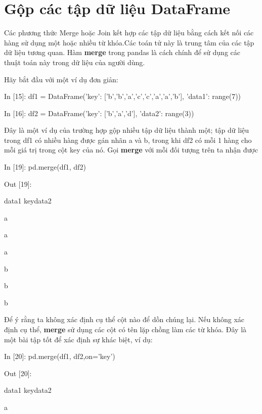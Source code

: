 \section{Gộp các tập dữ liệu DataFrame}
Các phương thức Merge hoặc Join kết hợp các tập dữ liệu bằng cách kết nối các hàng sử dụng một hoặc nhiều từ khóa.Các toán tử này là trung tâm của các tập dữ liệu tương quan. Hàm \textbf{merge} trong pandas là cách chính để sử dụng các thuật toán này trong dữ liệu của người dùng.\par
Hãy bắt đầu với một ví dụ đơn giản:\par
    \quad\textup{In [15]: df1 = DataFrame({'key': ['b','b','a','c','c','a','a','b'], 'data1': range(7)})}\par
    \par
    \quad\textup{In [16]: df2 = DataFrame({'key': ['b','a','d'], 'data2': range(3)})}\par
    Đây là một ví dụ của trường hợp gộp nhiều tập dữ liệu thành một; tập dữ liệu trong \textup{df1} có nhiều hàng được gán nhãn \textup{a} và \textup{b}, trong khi \textup{df2} có mỗi 1 hàng cho mỗi giá trị trong cột key của nó. Gọi \textbf{merge} với mỗi đối tượng trên ta nhận được \par
    \quad\textup{In [19]: pd.merge(df1, df2)}\par
    \quad\textup{Out [19]: }\par
    \quad\quad\textup{data1 key\quad data2}\par
     \quad{} \quad a \quad{}\par
     \quad{} \quad a \quad{}\par
     \quad{} \quad a \quad{}\par
     \quad{} \quad b \quad{}\par
     \quad{} \quad b \quad{}\par
     \quad{} \quad b \quad{}\par
Để ý rằng ta không xác định cụ thể cột nào để dồn chúng lại. Nếu không xác định cụ thể, \textbf{merge} sử dụng các cột có tên lặp chồng làm các từ khóa. Đây là một bài tập tốt để xác định sự khác biệt, ví dụ: \par
    \quad\textup{In [20]: pd.merge(df1, df2,on='key')}\par
    \quad\textup{Out [20]: }\par
    \quad\quad\textup{data1 key\quad data2}\par
     \quad{} \quad a \quad{}\par

